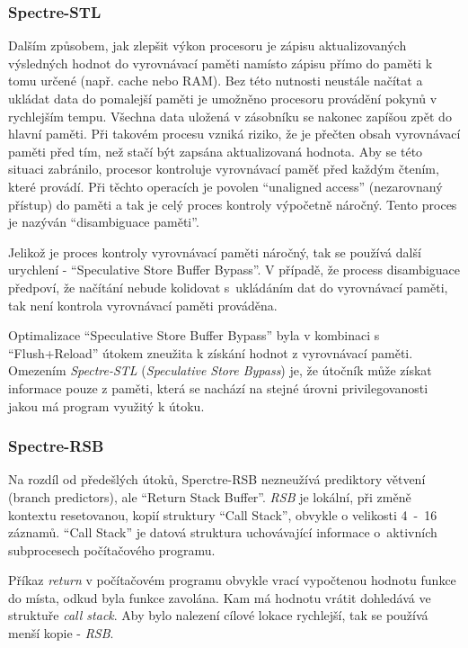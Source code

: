 \subsubsection{Spectre-STL}

Dalším způsobem, jak zlepšit výkon procesoru je zápisu aktualizovaných výsledných hodnot do vyrovnávací paměti namísto zápisu přímo do paměti k tomu určené (např. cache nebo RAM).
Bez této nutnosti neustále načítat a ukládat data do pomalejší paměti je umožněno procesoru provádění pokynů v rychlejším tempu.
Všechna data uložená v zásobníku se nakonec zapíšou zpět do hlavní paměti.
Při takovém procesu vzniká riziko, že je přečten obsah vyrovnávací paměti před tím, než stačí být zapsána aktualizovaná hodnota.
Aby se této situaci zabránilo, procesor kontroluje vyrovnávací paměť před každým čtením, které provádí.
Při těchto operacích je povolen \enquote{unaligned access} (nezarovnaný přístup) do paměti a tak je celý proces kontroly výpočetně náročný.
Tento proces je nazýván \enquote{disambiguace paměti}.

Jelikož je proces kontroly vyrovnávací paměti náročný, tak se používá další urychlení - \enquote{Speculative Store Buffer Bypass}.
V případě, že process disambiguace předpoví, že načítání nebude kolidovat s~ukládáním dat do vyrovnávací paměti, tak není kontrola vyrovnávací paměti prováděna.

Optimalizace \enquote{Speculative Store Buffer Bypass} byla v kombinaci s \enquote{Flush+Reload} útokem zneužita k získání hodnot z vyrovnávací paměti.
Omezením \textit{Spectre-STL} (\textit{Speculative Store Bypass}) je, že útočník může získat informace pouze z paměti, která se nachází na stejné úrovni privilegovanosti jakou má program využitý k útoku.

\subsubsection{Spectre-RSB}

Na rozdíl od předešlých útoků, Sperctre-RSB nezneužívá prediktory větvení (branch predictors), ale \enquote{Return Stack Buffer}.
\textit{RSB} je lokální, při změně kontextu resetovanou, kopií struktury \enquote{Call Stack}, obvykle o velikosti 4~-~16 záznamů.
\enquote{Call Stack} je datová struktura uchovávající informace o~aktivních subprocesech počítačového programu.

Příkaz \textit{return} v počítačovém programu obvykle vrací vypočtenou hodnotu funkce do místa, odkud byla funkce zavolána.
Kam má hodnotu vrátit dohledává ve struktuře \textit{call stack}.
Aby bylo nalezení cílové lokace rychlejší, tak se používá menší kopie - \textit{RSB}.

